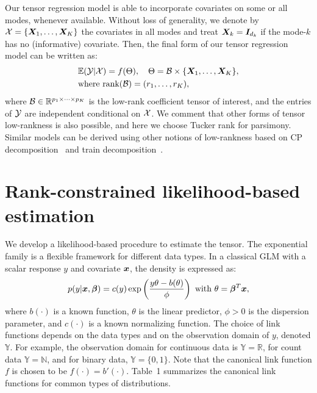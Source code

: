 \documentclass[twoside]{article}
\theoremstyle{plain}
\theoremstyle{definition}
\begin{document}
Our tensor regression model is able to incorporate covariates on some or all modes, whenever available. Without loss of generality, we denote by $\mathcal{X}=\{\bm X_1,\ldots,\bm X_K\}$ the covariates in all modes and treat $\bm X_k=\bm I_{d_k}$ if the mode-$k$ has no (informative) covariate. Then, the final form of our tensor regression model can be written as:
\begin{align}\label{eq:tensormodel}
&\mathbb{E}(\mathcal{Y}|\mathcal{X})=f(\Theta),\quad \Theta =\mathcal{B}\times\{\bm X_1,\ldots,\bm X_K\},\notag\\
&\text{where}\ \text{rank}(\mathcal{B})=(r_1,\ldots,r_K),
\end{align}
where $\mathcal{B}\in\mathbb{R}^{p_1\times \cdots\times p_K}$ is the low-rank coefficient tensor of interest, and the entries of $\mathcal{Y}$ are independent conditional on $\mathcal{X}$. We comment that other forms of tensor low-rankness is also possible, and here we choose Tucker rank for parsimony. Similar models can be derived using other notions of low-rankness based on CP decomposition~\cite{hitchcock1927expression} and train decomposition~\cite{oseledets2011tensor}. 

\section{Rank-constrained likelihood-based estimation}
We develop a likelihood-based procedure to estimate the tensor. The exponential family is a flexible framework for different data types. In a classical GLM with a scalar response $y$ and covariate $\bm x$, the density is expressed as:
\[
p(y|\bm x, \boldsymbol{\beta})=c(y)\exp\left({y\theta- b(\theta) \over \phi}\right)\ \text{with}\ \theta=\boldsymbol{\beta}^T\bm x,
\]
where $b(\cdot)$ is a known function, $\theta$ is the linear predictor, $\phi>0$ is the dispersion parameter, and $c(\cdot)$ is a known normalizing function. The choice of link functions depends on the data types and on the observation domain of $y$, denoted $\mathbb{Y}$. For example, the observation domain for continuous data is $\mathbb{Y}=\mathbb{R}$, for count data $\mathbb{Y}=\mathbb{N}$, and for binary data, $\mathbb{Y}=\{0,1\}$. 
Note that the canonical link function $f$ is chosen to be $f(\cdot)=b'(\cdot)$. Table~1 summarizes the canonical link functions for common types of distributions. 
\end{document}
